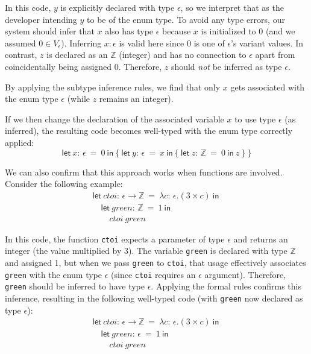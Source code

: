 \documentclass[peerreview, 10pt]{IEEEtran}
\newcommand{\Z}{\ensuremath{\mathbb{Z}}}
\newcommand{\lett}[4]{\ensuremath{\mathsf{let}\ #1\mathsf{:}\,#2\ \mathsf{=}\ #3\ \mathsf{in}\ #4}}
\newcommand{\funct}[3]{\ensuremath{\lambda #1\mathsf{:}\,#2.#3}}
\newcommand{\apply}[2]{\ensuremath{#1\ #2}}
\newcommand{\arrowt}[2]{\ensuremath{{#1}\rightarrow{#2}}}
\begin{document}
In this code, $y$ is explicitly declared with type $\epsilon$, so we interpret that as the developer intending $y$ to be of the enum type. To avoid any type errors, our system should infer that $x$ also has type $\epsilon$ because $x$ is initialized to $0$ (and we assumed $0 \in V_\epsilon$). Inferring $x:\epsilon$ is valid here since $0$ is one of $\epsilon$'s variant values. In contrast, $z$ is declared as an $\mathbb{Z}$ (integer) and has no connection to $\epsilon$ apart from coincidentally being assigned $0$. Therefore, $z$ should \emph{not} be inferred as type $\epsilon$.

By applying the subtype inference rules, we find that only $x$ gets associated with the enum type $\epsilon$ (while $z$ remains an integer).

If we then change the declaration of the associated variable $x$ to use type $\epsilon$ (as inferred), the resulting code becomes well-typed with the enum type correctly applied:
\[
\lett{x}{\epsilon}{0}{
    \{\ \lett{y}{\epsilon}{x}{\{\ 
        \lett{z}{\Z}{0}{z}
    \ \}}\ \}
}\]

We can also confirm that this approach works when functions are involved. Consider the following example:
\[
\begin{array}{l}
    \lett{ctoi}{\arrowt{\epsilon}{\Z}}{\funct{c}{\epsilon}{(3\times c)}}{}\\
    \quad \lett{green}{\Z}{1}{} \\
    \quad \quad \apply{ctoi}{green}
\end{array}
\]

In this code, the function \texttt{ctoi} expects a parameter of type $\epsilon$ and returns an integer (the value multiplied by 3). The variable \texttt{green} is declared with type $\Z$ and assigned 1, but when we pass \texttt{green} to \texttt{ctoi}, that usage effectively associates \texttt{green} with the enum type $\epsilon$ (since \texttt{ctoi} requires an $\epsilon$ argument). Therefore, \texttt{green} should be inferred to have type $\epsilon$. Applying the formal rules confirms this inference, resulting in the following well-typed code (with \texttt{green} now declared as type $\epsilon$):
\[
\begin{array}{l}
    \lett{ctoi}{\arrowt{\epsilon}{\Z}}{\funct{c}{\epsilon}{(3\times c)}}{}\\
    \quad \lett{green}{\epsilon}{1}{} \\
    \quad \quad \apply{ctoi}{green}
\end{array}
\]
\end{document}
